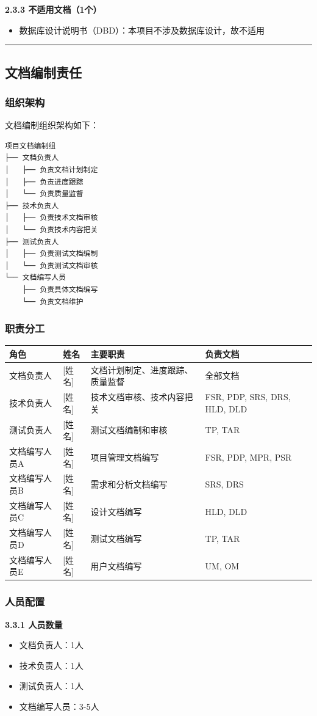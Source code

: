 \documentclass[12pt,a4paper]{article}
\numberwithin{equation}{section}  %
\begin{document}
\textbf{2.3.3 不适用文档（1个）}
\begin{itemize}
\item 数据库设计说明书（DBD）：本项目不涉及数据库设计，故不适用
\end{itemize}

\hrule
\subsection{文档编制责任}
\subsubsection{组织架构}
文档编制组织架构如下：

\begin{verbatim}
项目文档编制组
├── 文档负责人
│   ├── 负责文档计划制定
│   ├── 负责进度跟踪
│   └── 负责质量监督
├── 技术负责人
│   ├── 负责技术文档审核
│   └── 负责技术内容把关
├── 测试负责人
│   ├── 负责测试文档编制
│   └── 负责测试文档审核
└── 文档编写人员
    ├── 负责具体文档编写
    └── 负责文档维护
\end{verbatim}

\subsubsection{职责分工}
\begin{longtable}{|p{3cm}|p{4cm}|p{4cm}|p{3cm}|}
\hline
角色 & 姓名 & 主要职责 & 负责文档 \\
\hline
文档负责人 & [姓名] & 文档计划制定、进度跟踪、质量监督 & 全部文档 \\
技术负责人 & [姓名] & 技术文档审核、技术内容把关 & FSR, PDP, SRS, DRS, HLD, DLD \\
测试负责人 & [姓名] & 测试文档编制和审核 & TP, TAR \\
文档编写人员A & [姓名] & 项目管理文档编写 & FSR, PDP, MPR, PSR \\
文档编写人员B & [姓名] & 需求和分析文档编写 & SRS, DRS \\
文档编写人员C & [姓名] & 设计文档编写 & HLD, DLD \\
文档编写人员D & [姓名] & 测试文档编写 & TP, TAR \\
文档编写人员E & [姓名] & 用户文档编写 & UM, OM \\
\hline
\end{longtable}

\subsubsection{人员配置}
\textbf{3.3.1 人员数量}
\begin{itemize}
\item 文档负责人：1人
\item 技术负责人：1人
\item 测试负责人：1人
\item 文档编写人员：3-5人
\end{itemize}
\end{document}
